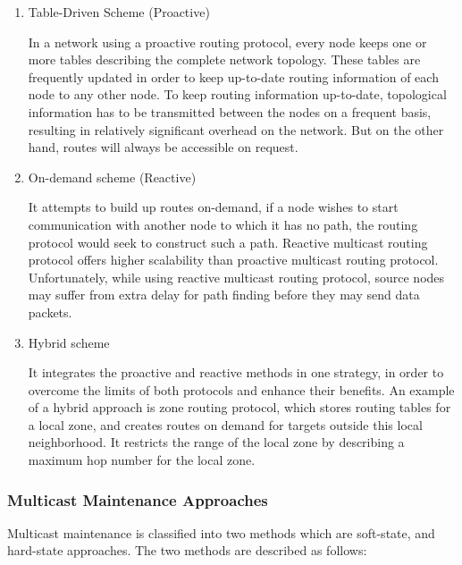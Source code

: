 \begin{enumerate}
\item Table-Driven Scheme (Proactive)

In a network using a proactive routing protocol, every node keeps one or more tables describing the complete network topology. These tables are frequently updated in order to keep up-to-date routing information of each node to any other node. To keep routing information up-to-date, topological information has to be transmitted between the nodes on a frequent basis, resulting in relatively significant overhead on the network. But on the other hand, routes will always be accessible on request. 

\item On-demand scheme (Reactive)

It attempts to build up routes on-demand, if a node wishes to start communication with another node to which it has no path, the routing protocol would seek to construct such a path. Reactive multicast routing protocol offers higher scalability than proactive multicast routing protocol. Unfortunately, while using reactive multicast routing protocol, source nodes may suffer from extra delay for path finding before they may send data packets. 

\item Hybrid scheme

It integrates the proactive and reactive methods in one strategy, in order to overcome the limits of both protocols and enhance their benefits. An example of a hybrid approach is zone routing protocol, which stores routing tables for a local zone, and creates routes on demand for targets outside this local neighborhood. It restricts the range of the local zone by describing a maximum hop number for the local zone. 
\end{enumerate}

\subsubsection{Multicast Maintenance Approaches}
Multicast maintenance is classified into two methods which are soft-state, and hard-state approaches. The two methods are described as follows:

